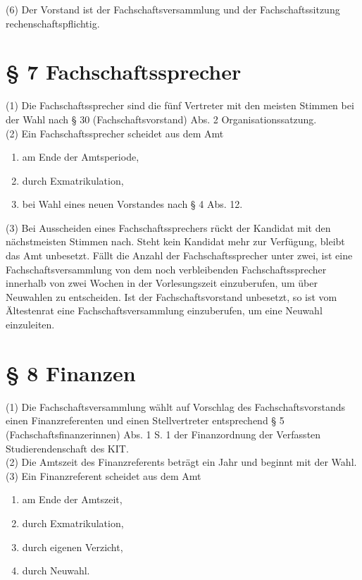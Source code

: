\documentclass[a4paper, parskip=half, numbers=noenddot]{scrartcl}
\begin{document}
(6) Der Vorstand ist der Fachschaftsversammlung und der Fachschaftssitzung rechenschaftspflichtig.


%
%

\section*{§ 7 Fachschaftssprecher}

(1) Die Fachschaftssprecher sind die fünf Vertreter mit den meisten Stimmen bei der Wahl nach § 30 (Fachschaftsvorstand) Abs. 2 Organisationssatzung.\\

(2) Ein Fachschaftssprecher scheidet aus dem Amt
\begin{enumerate}
    \item am Ende der Amtsperiode,
    \item durch Exmatrikulation,
    \item bei Wahl eines neuen Vorstandes nach § 4 Abs. 12.
\end{enumerate}
(3) Bei Ausscheiden eines Fachschaftssprechers rückt der Kandidat mit den nächstmeisten
Stimmen nach. Steht kein Kandidat mehr zur Verfügung, bleibt das Amt unbesetzt. Fällt die
Anzahl der Fachschaftssprecher unter zwei, ist eine Fachschaftsversammlung von dem noch
verbleibenden Fachschaftssprecher innerhalb von zwei Wochen in der Vorlesungszeit einzuberufen, um über Neuwahlen zu entscheiden. Ist der Fachschaftsvorstand unbesetzt, so ist vom Ältestenrat eine Fachschaftsversammlung einzuberufen, um eine Neuwahl einzuleiten.


%
%

\section*{§ 8 Finanzen}

(1) Die Fachschaftsversammlung wählt auf Vorschlag des Fachschaftsvorstands einen Finanzreferenten und einen Stellvertreter entsprechend § 5 (Fachschaftsfinanzerinnen) Abs. 1 S. 1 der Finanzordnung der Verfassten Studierendenschaft des KIT.\\

(2) Die Amtszeit des Finanzreferents beträgt ein Jahr und beginnt mit der Wahl.\\

(3) Ein Finanzreferent scheidet aus dem Amt
\begin{enumerate}
    \item am Ende der Amtszeit,
    \item durch Exmatrikulation,
    \item durch eigenen Verzicht,
    \item durch Neuwahl.
\end{enumerate}
\end{document}
